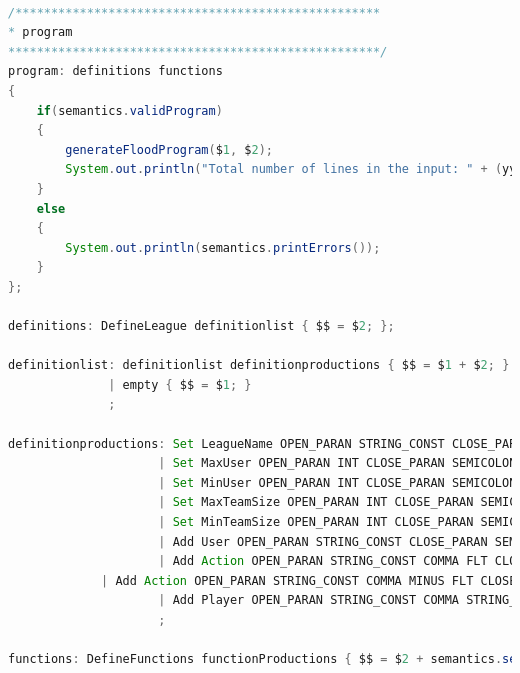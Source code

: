 \documentclass[12pt]{report}
\begin{document}
\begin{singlespace}
\begin{lstlisting}[language=Java,label=some-code,caption={flood$\_$grammar.y}]
%%

/***************************************************
* program
****************************************************/
program: definitions functions
{
	if(semantics.validProgram)
	{
		generateFloodProgram($1, $2);
		System.out.println("Total number of lines in the input: " + (yyline - 1));
	}
	else
	{
		System.out.println(semantics.printErrors());
	}
};

definitions: DefineLeague definitionlist { $$ = $2; };
           
definitionlist: definitionlist definitionproductions { $$ = $1 + $2; }
              | empty { $$ = $1; }
              ;

definitionproductions: Set LeagueName OPEN_PARAN STRING_CONST CLOSE_PARAN SEMICOLON { $$ = "myLeague = new League(" + $4 + ");\n"; }
                     | Set MaxUser OPEN_PARAN INT CLOSE_PARAN SEMICOLON { $$ = "myLeague.setMaxUser(" + $4 + ");\n"; }
                     | Set MinUser OPEN_PARAN INT CLOSE_PARAN SEMICOLON { $$ = "myLeague.setMinUser(" + $4 + ");\n"; }
                     | Set MaxTeamSize OPEN_PARAN INT CLOSE_PARAN SEMICOLON { $$ = "myLeague.setMaxTeamSize(" + $4 + ");\n"; }
                     | Set MinTeamSize OPEN_PARAN INT CLOSE_PARAN SEMICOLON { $$ = "myLeague.setMinTeamSize(" + $4 + ");\n"; }
                     | Add User OPEN_PARAN STRING_CONST CLOSE_PARAN SEMICOLON { $$ = "myLeague.addUser(new User(" + $4 + "));\n"; semantics.addUser($4, yyline); }
                     | Add Action OPEN_PARAN STRING_CONST COMMA FLT CLOSE_PARAN SEMICOLON { $$ = "myLeague.addAction(new Action(" + $4 + ", " + $6 + "));\n"; semantics.addAction($4, yyline); }
		     | Add Action OPEN_PARAN STRING_CONST COMMA MINUS FLT CLOSE_PARAN SEMICOLON %prec NEG { $$ = "myLeague.addAction(new Action(" + $4 + ", -" + $7 + "));\n"; semantics.addAction($4, yyline); }
                     | Add Player OPEN_PARAN STRING_CONST COMMA STRING_CONST CLOSE_PARAN SEMICOLON { $$ = "myLeague.addPlayer(new Player(" + $4 + ", " + $6 + "));\n"; semantics.addPlayer($4, yyline); }
                     ;

functions: DefineFunctions functionProductions { $$ = $2 + semantics.setFlags(); };


\end{lstlisting}
\end{singlespace}
\end{document}
